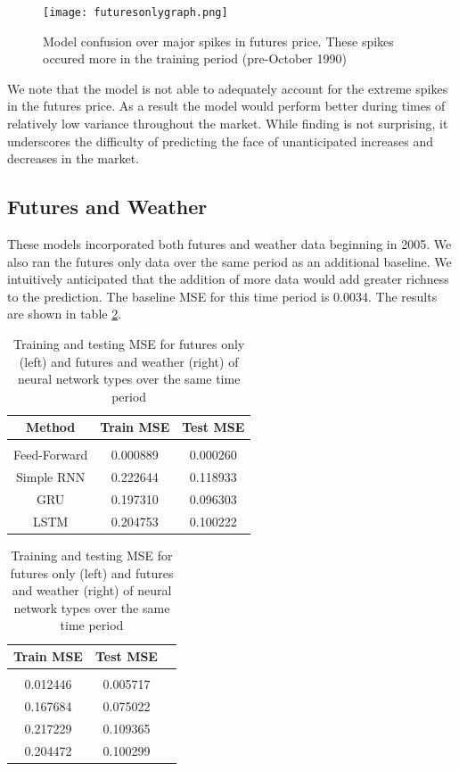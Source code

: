\documentclass[twoside,11pt]{article}
\begin{document}

\begin{figure}[htbp]
	\centering
	\texttt{[image: futuresonlygraph.png]}
	\caption{Model confusion over major spikes in futures price. These spikes occured more in the training period (pre-October 1990) }
	\label{fig:futuresonlygraph}
\end{figure}

We note that the model is not able to adequately account for the extreme spikes in the futures price. As a result the model would perform better during times of relatively low variance throughout the market. While finding is not surprising, it underscores the difficulty of predicting the face of unanticipated increases and decreases in the market.   

\subsection{Futures and Weather}

These models incorporated both futures and weather data beginning in 2005. We also ran the futures only data over the same period as an additional baseline. We intuitively anticipated that the addition of more data would add greater richness to the prediction. The baseline MSE for this time period is 0.0034. The results are shown in table \ref{tab:futuresandweather}.

\begin{table}[h!]
	\begin{center}
		\begin{tabular}{ccc}
			Method & Train MSE & Test MSE \\
			\hline \\[-11pt]
			Feed-Forward & 0.000889 & 0.000260 \\
			Simple RNN & 0.222644 & 0.118933 \\ 
			GRU & 0.197310 & 0.096303 \\
			LSTM & 0.204753 & 0.100222 \\
			\hline
		\end{tabular}
	\quad
		\begin{tabular}{ccc}
			Train MSE & Test MSE \\
			\hline \\[-11pt]
			0.012446 & 0.005717 \\
			0.167684 & 0.075022 \\ 
			0.217229 & 0.109365 \\
			0.204472 & 0.100299 \\
			\hline
		\end{tabular}
		\label{tab:futuresandweather}
		\caption{Training and testing MSE for futures only (left) and futures and weather (right) of neural network types over the same time period}
	\end{center}
\end{table}
\end{document}
